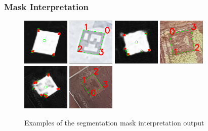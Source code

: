 \documentclass[10pt]{book}
\begin{document}
\subsubsection{Mask Interpretation}

\begin{figure}
  \centering
     {\includegraphics[width=0.2\textwidth]{image/segpet_mask_8_pred_corners}}
     {\includegraphics[width=0.2\textwidth]{image/segpet_mask_8_pred_rect}}
     {\includegraphics[width=0.2\textwidth]{image/segpet_mask_10_pred_corners}}
     {\includegraphics[width=0.2\textwidth]{image/segpet_mask_10_pred_rect}}
     {\includegraphics[width=0.2\textwidth]{image/segpet_mask_6_pred_corners}}
     {\includegraphics[width=0.2\textwidth]{image/segpet_mask_6_pred_rect}}
  \caption{Examples of the segmentation mask interpretation output}
  \label{fig:segpet_rect_interp}
\end{figure}
\end{document}
